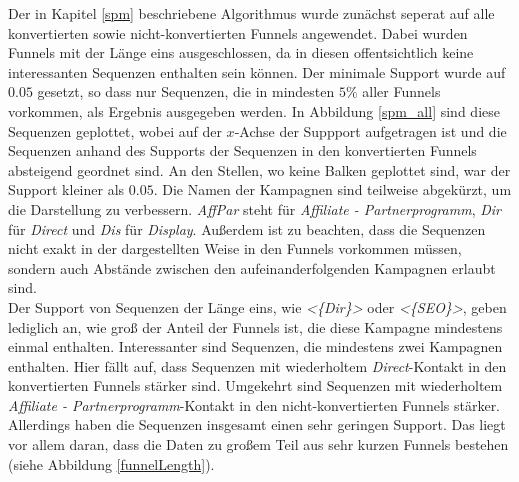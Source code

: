 Der in Kapitel \ref{spm} beschriebene Algorithmus wurde zunächst seperat auf alle konvertierten sowie nicht-konvertierten Funnels angewendet. Dabei wurden Funnels mit der Länge eins ausgeschlossen, da in diesen offentsichtlich keine interessanten Sequenzen enthalten sein können. Der minimale Support wurde auf $0.05$ gesetzt, so dass nur Sequenzen, die in mindesten $5 \%$ aller Funnels vorkommen, als Ergebnis ausgegeben werden. In Abbildung \ref{spm_all} sind diese Sequenzen geplottet, wobei auf der $x$-Achse der Suppport aufgetragen ist und die Sequenzen anhand des Supports der Sequenzen in den konvertierten Funnels absteigend geordnet sind. An den Stellen, wo keine Balken geplottet sind, war der Support kleiner als $0.05$. Die Namen der Kampagnen sind teilweise abgekürzt, um die Darstellung zu verbessern. \textit{AffPar} steht für \textit{Affiliate - Partnerprogramm}, \textit{Dir} für \textit{Direct} und \textit{Dis} für \textit{Display}. Außerdem ist zu beachten, dass die Sequenzen nicht exakt in der dargestellten Weise in den Funnels vorkommen müssen, sondern auch Abstände zwischen den aufeinanderfolgenden Kampagnen erlaubt sind.\\
Der Support von Sequenzen der Länge eins, wie \textit{<\{Dir\}>} oder \textit{<\{SEO\}>}, geben lediglich an, wie groß der Anteil der Funnels ist, die diese Kampagne mindestens einmal enthalten. Interessanter sind Sequenzen, die mindestens zwei Kampagnen enthalten. Hier fällt auf, dass Sequenzen mit wiederholtem \textit{Direct}-Kontakt in den konvertierten Funnels stärker sind. Umgekehrt sind  Sequenzen mit wiederholtem \textit{Affiliate - Partnerprogramm}-Kontakt in den nicht-konvertierten Funnels stärker. Allerdings haben die Sequenzen insgesamt einen sehr geringen Support. Das liegt vor allem daran, dass die Daten zu großem Teil aus sehr kurzen Funnels bestehen (siehe Abbildung \ref{funnelLength}).\\
